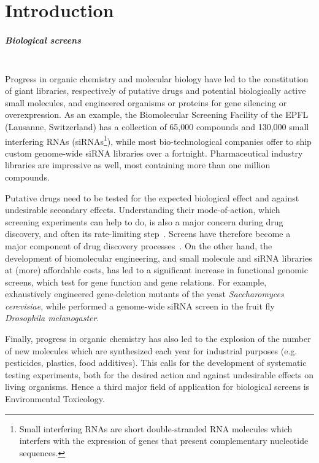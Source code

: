 \chapter{Introduction}
\paragraph*{Biological screens}~\\
Progress in organic chemistry and molecular biology have led to the constitution of giant libraries, respectively of putative drugs and potential biologically active small molecules, and engineered organisms or proteins for gene silencing or overexpression. As an example, the Biomolecular Screening Facility of the EPFL (Lausanne, Switzerland) has a collection of 65,000 compounds and 130,000 small interfering RNAs (siRNAs\footnote{Small interfering RNAs are short double-stranded RNA molecules which interfers with the expression of genes that present complementary nucleotide sequences.}), while most bio-technological companies offer to ship custom genome-wide siRNA libraries over a fortnight. Pharmaceutical industry libraries are impressive as well, most containing more than one million compounds.

Putative drugs need to be tested for the expected biological effect and against undesirable secondary effects. Understanding their mode-of-action, which screening experiments can help to do, is also a major concern during drug discovery, and often its rate-limiting step~\cite{pmid15547975}. Screens have therefore become a major component of drug discovery processes~\cite{pmid22155864}. On the other hand, the development of biomolecular engineering, and small molecule and siRNA libraries at (more) affordable costs, has led to a significant increase in functional genomic screens, which test for gene function and gene relations. For example, \cite{pmid12140549} exhaustively engineered gene-deletion mutants of the yeast \textit{Saccharomyces cerevisiae}, while \cite{pmid16511445} performed a genome-wide siRNA screen in the fruit fly \textit{Drosophila melanogaster}.

Finally, progress in organic chemistry has also led to the explosion of the number of new molecules which are synthesized each year for industrial purposes (e.g. pesticides, plastics, food additives). This calls for the development of systematic testing experiments, both for the desired action and against undesirable effects on living organisms. Hence a third major field of application for biological screens is Environmental Toxicology.


